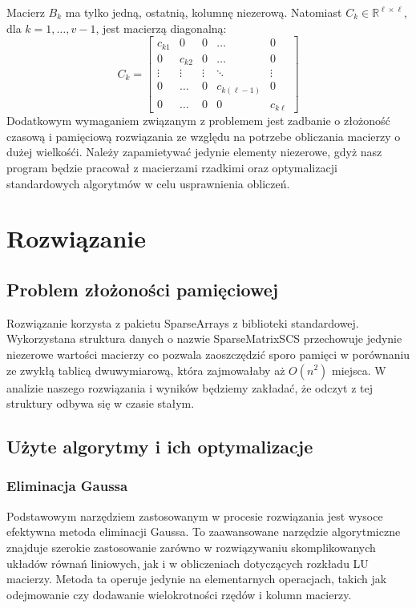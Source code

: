 \documentclass{article}
\begin{document}
	Macierz $B_k$ ma tylko jedną, ostatnią, kolumnę niezerową. Natomiast $C_k \in \mathbb{R}^{\ell \times \ell}$, dla $k = 1, \ldots, v - 1$, jest macierzą diagonalną:\\
	\[
	C_k = \begin{bmatrix}
	    c_{k1} & 0 & 0 & \dots & 0 \\
	    0 & c_{k2} & 0 & \dots & 0 \\
	    \vdots & \vdots & \vdots & \ddots & \vdots \\
	    0 & \dots & 0 & c_{k(\ell-1)} & 0 \\
	    0 & \dots & 0 & 0 & c_{k\ell}
	\end{bmatrix}
	\]
	Dodatkowym wymaganiem związanym z problemem jest zadbanie o złożoność czasową i pamięciową rozwiązania ze względu na potrzebe obliczania macierzy o dużej wielkośći. Należy zapamietywać jedynie elementy niezerowe, gdyż nasz program będzie  pracował z macierzami rzadkimi oraz optymalizacji standardowych algorytmów w celu usprawnienia obliczeń.

\section*{Rozwiązanie}
\subsection*{Problem złożoności pamięciowej}
	Rozwiązanie korzysta z pakietu SparseArrays z biblioteki standardowej. Wykorzystana struktura danych o nazwie SparseMatrixSCS przechowuje jedynie niezerowe wartości macierzy co pozwala zaoszczędzić sporo pamięci w porównaniu ze zwykłą tablicą dwuwymiarową, która zajmowałaby aż $O(n^2)$ miejsca. W analizie naszego rozwiązania i wyników będziemy zakładać, że odczyt z tej struktury odbywa się w czasie stałym.

\subsection*{Użyte algorytmy i ich optymalizacje}
\subsubsection*{Eliminacja Gaussa}
	Podstawowym narzędziem zastosowanym w procesie rozwiązania jest wysoce efektywna metoda eliminacji Gaussa. To zaawansowane narzędzie algorytmiczne znajduje szerokie zastosowanie zarówno w rozwiązywaniu skomplikowanych układów równań liniowych, jak i w obliczeniach dotyczących rozkładu LU macierzy. Metoda ta operuje jedynie na elementarnych operacjach, takich jak odejmowanie czy dodawanie wielokrotności rzędów i kolumn macierzy.\\
\end{document}
